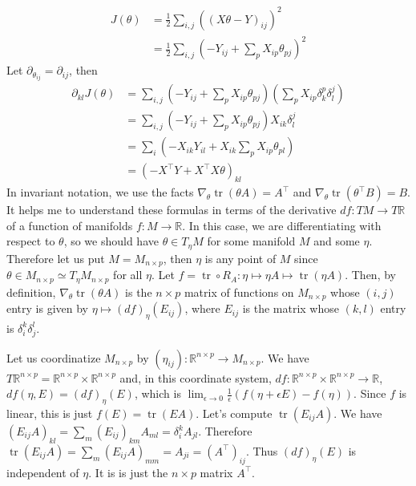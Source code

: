 \documentclass[paper=letter]{scrartcl}
\theoremstyle{definition}
\DeclareMathOperator{\trace}{tr}
\newcommand{\grad}{\nabla}
\newcommand{\tpose}{^\top}
\newcommand{\reals}{\mathbb R}
\begin{document}
\begin{align}
	\nonumber
	J(\theta)
	&= \frac{1}{2} \sum_{i,j} ((X\theta - Y)_{ij})^2 \\
	\nonumber
	& = \frac{1}{2} \sum_{i,j}
	\left( -Y_{ij} + \sum_{p} X_{ip} \theta_{pj} \right)^2
\end{align}
Let $\partial_{\theta_{ij}} = \partial_{ij}$, then
\begin{align}
	\nonumber
	\partial_{kl} J(\theta) & =  \sum_{i,j} \left( -Y_{ij} + \sum_{p} X_{ip} 
\theta_{pj} \right)\left( \sum_p X_{ip} \delta_{k}^{p} \delta^j_l \right)\\
\nonumber
& = \sum_{i,j} (-Y_{ij} +  \sum_p X_{ip} \theta_{pj} )X_{ik}\delta^j_l\\
\nonumber
& = \sum_{i} \left(-X_{ik} Y_{il}+ X_{ik}\sum_{p} X_{ip} \theta_{pl} \right)\\
\nonumber
& = ( - X\tpose Y + X\tpose X \theta)_{kl}
\end{align}
In invariant notation, we use the facts $\grad_\theta \trace (\theta A)= 
A\tpose$ and $\grad_{\theta}\trace(\theta\tpose B)= B$.   It helps me to 
understand these formulas in terms of the derivative $df \colon TM \to T\reals$ 
of a function of manifolds $f \colon M \to \reals$.  In this case, we are 
differentiating with respect to $\theta$, so we should have $\theta \in T_\eta 
M$ for some manifold $M$ and some $\eta$.  Therefore let us put $M = M_{n\times 
p}$, then $\eta$ is any point of $M$ since $\theta \in M_{n\times p} \simeq 
T_\eta M_{n \times p}$ for all $\eta$.  Let $f = \trace \circ R_A \colon \eta 
\mapsto \eta A \mapsto \trace(\eta A)$.  Then, by definition, $\grad_\theta 
\trace(\theta A)$ is the $n \times p$ matrix of functions on $M_{n \times p}$ 
whose $(i,j)$ entry is given by $\eta \mapsto (df)_\eta(E_{ij})$, where 
$E_{ij}$ is the matrix whose $(k,l)$ entry is $\delta^k_i \delta^l_j$.

Let us coordinatize $M_{n\times p}$ by $(\eta_{ij}) \colon \reals^{n\times p} 
\to M_{n\times p}$.  We have $T\reals^{n\times p} = \reals^{n\times p} \times 
\reals^{n\times p}$ and, in this coordinate system, $df \colon \reals^{n\times 
p} \times \reals^{n\times  p} \to \reals$, $df(\eta, E) = (df)_\eta (E)$, which 
is $\lim_{\epsilon \to 0} \frac{1}{\epsilon} (f(\eta + \epsilon E) - f(\eta))$.  
Since $f$ is linear, this is just $f(E) = \trace (EA)$.  Let's compute 
$\trace(E_{ij} A)$.  We have $(E_{ij}A)_{kl} = \sum_{m} (E_{ij})_{km} A_{ml} = 
\delta^k_i A_{jl}$.  Therefore $\trace(E_{ij} A) = \sum_m (E_{ij}A)_{mm} = 
A_{ji} = (A\tpose)_{ij}$.  Thus $(df)_\eta (E)$ is independent of $\eta$. It is
is just the $n \times p$ matrix $A \tpose$.
\end{document}
